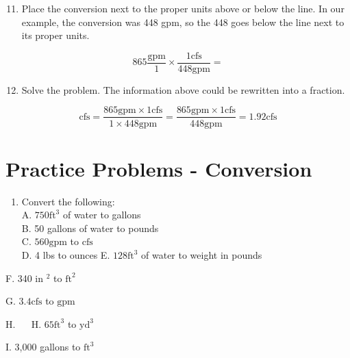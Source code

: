 \documentclass[10pt]{article}
\begin{document}
\begin{enumerate}
  \setcounter{enumi}{10}
  \item Place the conversion next to the proper units above or below the line. In our example, the conversion was 448 gpm, so the 448 goes below the line next to its proper units.
\end{enumerate}
$$
865 \frac{\mathrm{gpm}}{1} \times \frac{1 \mathrm{cfs}}{448 \mathrm{gpm}}=
$$

\begin{enumerate}
  \setcounter{enumi}{11}
  \item Solve the problem. The information above could be rewritten into a fraction.
\end{enumerate}
$$
\mathrm{cfs}=\frac{865 \mathrm{gpm} \times 1 \mathrm{cfs}}{1 \times 448 \mathrm{gpm}}=\frac{865 \mathrm{gpm} \times 1 \mathrm{cfs}}{448 \mathrm{gpm}}=1.92 \mathrm{cfs}
$$

\section{Practice Problems - Conversion}
\begin{enumerate}
  \item Convert the following:\\
A. $750 \mathrm{ft}^{3}$ of water to gallons\\
B. 50 gallons of water to pounds\\
C. $560 \mathrm{gpm}$ to $\mathrm{cfs}$\\
D. 4 lbs to ounces E. $128 \mathrm{ft}^{3}$ of water to weight in pounds
\end{enumerate}
F. 340 in $^{2}$ to $\mathrm{ft}^{2}$

G. $3.4 \mathrm{cfs}$ to $\mathrm{gpm}$

H. $\quad$ H. $65 \mathrm{ft}^{3}$ to $\mathrm{yd}^{3}$

I. 3,000 gallons to $\mathrm{ft}^{3}$
\end{document}
